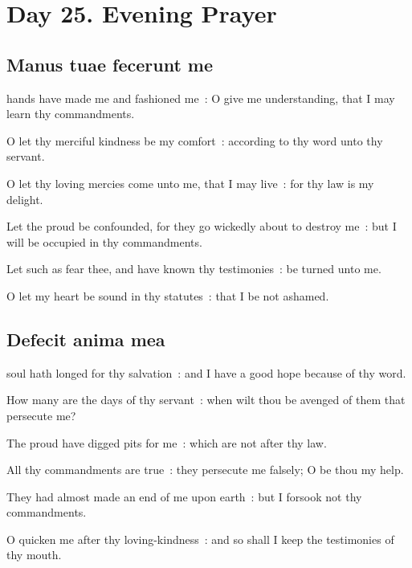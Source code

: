 \section*{Day 25. Evening Prayer}

\subsection{Manus tuae fecerunt me}


 hands have made me and fashioned me~: O give me understanding, that I may learn thy commandments.\par
{}
O let thy merciful kindness be my comfort~: according to thy word unto thy servant.\par
{}O let thy loving mercies come unto me, that I may live~: for thy law is my delight.\par
{}Let the proud be confounded, for they go wickedly about to destroy me~: but I will be occupied in thy commandments.\par
{}Let such as fear thee, and have known thy testimonies~: be turned unto me.\par
{}O let my heart be sound in thy statutes~: that I be not ashamed.\par

\subsection{Defecit anima mea}


 soul hath longed for thy salvation~: and I have a good hope because of thy word.\par
{}
How many are the days of thy servant~: when wilt thou be avenged of them that persecute me?\par
{}The proud have digged pits for me~: which are not after thy law.\par
{}All thy commandments are true~: they persecute me falsely; O be thou my help.\par
{}They had almost made an end of me upon earth~: but I forsook not thy commandments.\par
{}O quicken me after thy loving-kindness~: and so shall I keep the testimonies of thy mouth.\par


